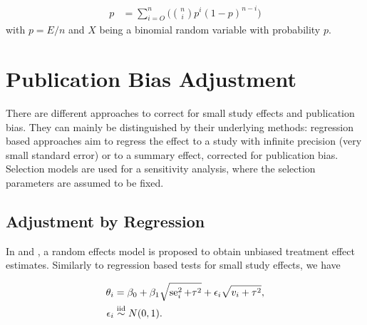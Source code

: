 \documentclass[11pt,a4paper,twoside]{book}\usepackage[]{graphicx}\usepackage[]{color}
\begin{document}
\begin{align}
p &= \sum_{i = O}^n\Big({n \choose i} p^i (1-p)^{n - i}\Big) \nonumber
\end{align}
with $p = E/n$ and $X$ being a binomial random variable with probability $p$. 











\section{Publication Bias Adjustment}
There are different approaches to correct for small study effects and publication bias. They can mainly be distinguished by their underlying methods: regression based approaches aim to regress the effect to a study with infinite precision (\ie very small standard error) or to a summary effect, corrected for publication bias. Selection models are used for a sensitivity analysis, where the selection parameters are assumed to be fixed. 

\subsection{Adjustment by Regression} \label{sec:regression.adjustment}
In \citet{limitmeta.2} and \citet{limitmeta}, a random effects model is proposed to obtain unbiased treatment effect estimates. Similarly to regression based tests for small study effects, we have

\begin{align}
\theta_i & = \beta_0 + \beta_1\sqrt{\se_i^2 + \tau^2} + \epsilon_i\sqrt{v_i + \tau^2}, \label{eq:limitmeta.regression} \\
\epsilon_i &\stackrel{\textrm{iid}}{\sim} N(0,1).
\end{align}
\end{document}
